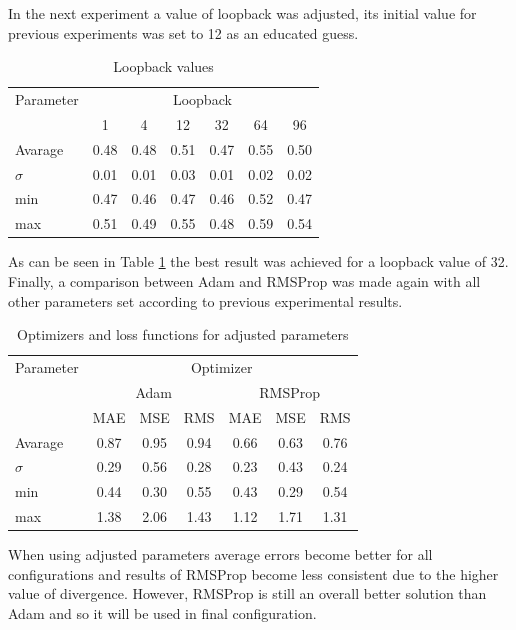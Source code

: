 \documentclass{article}
\begin{document}
In the next experiment a value of loopback was adjusted, its initial value for previous experiments
was set to 12 as an educated guess.
\begin{table}[htb] 
	\centering
	\caption{Loopback values}
	\label{tab:loopback}
	\begin{tabular}{l*{6}{c}}
		\hline
		\hline
		Parameter& \multicolumn{6}{c}{Loopback}  \\
		& 1& 4& 12& 32& 64& 96\\
		\hline
		Avarage & 0.48 & 0.48 & 0.51 & 0.47 & 0.55 & 0.50  \\
		$\sigma$ & 0.01 & 0.01 & 0.03 & 0.01 & 0.02 & 0.02  \\
		min & 0.47 & 0.46 & 0.47 & 0.46 & 0.52 & 0.47  \\
		max & 0.51 & 0.49 & 0.55 & 0.48 & 0.59 & 0.54  \\
		\hline
		\hline
	\end{tabular}
\end{table}
As can be seen in Table \ref{tab:loopback} the best result was achieved for a loopback value of 32.
Finally, a comparison between Adam and RMSProp was made again with all other parameters 
set according to previous experimental results.
\begin{table}[htb] 
	\centering
	\caption{Optimizers and loss functions for adjusted parameters}
	\label{tab:optimizers2}
	\begin{tabular}{l*{6}{c}}
		\hline
		\hline
		Parameter& \multicolumn{6}{c}{Optimizer}  \\
		&\multicolumn{3}{c}{Adam}&\multicolumn{3}{c}{RMSProp}\\
		\hline
		& MAE & MSE & RMS & MAE & MSE & RMS  \\
		Avarage & 0.87 & 0.95 & 0.94 & 0.66 & 0.63 & 0.76  \\
		$\sigma$ & 0.29 & 0.56 & 0.28 & 0.23 & 0.43 & 0.24  \\
		min & 0.44 & 0.30 & 0.55 & 0.43 & 0.29 & 0.54  \\
		max & 1.38 & 2.06 & 1.43 & 1.12 & 1.71 & 1.31  \\
		\hline
		\hline
	\end{tabular}
\end{table}
When using adjusted parameters average errors become better for all configurations and
results of RMSProp become less consistent due to the higher value of divergence.
However, RMSProp is still an overall better solution than Adam and so it will be used in final
configuration.
\end{document}
